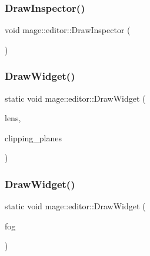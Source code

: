 \hypertarget{namespacemage_1_1editor_a2bd3932d0c7f95a953f3dd5d3f6870dd}{}\label{namespacemage_1_1editor_a2bd3932d0c7f95a953f3dd5d3f6870dd} 
\subsubsection{\texorpdfstring{Draw\+Inspector()}{DrawInspector()}}
{\footnotesize\ttfamily void mage\+::editor\+::\+Draw\+Inspector (\begin{DoxyParamCaption}{ }\end{DoxyParamCaption})}

\hypertarget{namespacemage_1_1editor_af483e3263db836fae49c4c4c059dd9c4}{}\label{namespacemage_1_1editor_af483e3263db836fae49c4c4c059dd9c4} 
\subsubsection{\texorpdfstring{Draw\+Widget()}{DrawWidget()}\hspace{0.1cm}{\footnotesize\ttfamily [1/20]}}
{\footnotesize\ttfamily static void mage\+::editor\+::\+Draw\+Widget (\begin{DoxyParamCaption}\item[{\hyperlink{classmage_1_1_camera_lens}{Camera\+Lens} \&}]{lens,  }\item[{const \hyperlink{namespacemage_aa87237ad091f5cd7da612b8523fc108f}{F32x2} \&}]{clipping\+\_\+planes }\end{DoxyParamCaption})\hspace{0.3cm}{\ttfamily [static]}}

\hypertarget{namespacemage_1_1editor_a8c96f88aab056a8b0904817ac1fa2a9d}{}\label{namespacemage_1_1editor_a8c96f88aab056a8b0904817ac1fa2a9d} 
\subsubsection{\texorpdfstring{Draw\+Widget()}{DrawWidget()}\hspace{0.1cm}{\footnotesize\ttfamily [2/20]}}
{\footnotesize\ttfamily static void mage\+::editor\+::\+Draw\+Widget (\begin{DoxyParamCaption}\item[{\hyperlink{classmage_1_1_fog}{Fog} \&}]{fog }\end{DoxyParamCaption})\hspace{0.3cm}{\ttfamily [static]}}

